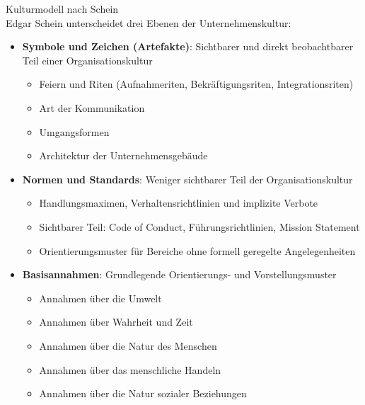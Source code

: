 \begin{concept}{Kulturmodell nach Schein}\\
Edgar Schein unterscheidet drei Ebenen der Unternehmenskultur:
\begin{itemize}
    \item \textbf{Symbole und Zeichen (Artefakte)}: Sichtbarer und direkt beobachtbarer Teil einer Organisationskultur
    \begin{itemize}
        \item Feiern und Riten (Aufnahmeriten, Bekräftigungsriten, Integrationsriten)
        \item Art der Kommunikation
        \item Umgangsformen
        \item Architektur der Unternehmensgebäude
    \end{itemize}
    \item \textbf{Normen und Standards}: Weniger sichtbarer Teil der Organisationskultur
    \begin{itemize}
        \item Handlungsmaximen, Verhaltensrichtlinien und implizite Verbote
        \item Sichtbarer Teil: Code of Conduct, Führungsrichtlinien, Mission Statement
        \item Orientierungsmuster für Bereiche ohne formell geregelte Angelegenheiten
    \end{itemize}
    \item \textbf{Basisannahmen}: Grundlegende Orientierungs- und Vorstellungsmuster
    \begin{itemize}
        \item Annahmen über die Umwelt
        \item Annahmen über Wahrheit und Zeit
        \item Annahmen über die Natur des Menschen
        \item Annahmen über das menschliche Handeln
        \item Annahmen über die Natur sozialer Beziehungen
    \end{itemize}
\end{itemize}
\end{concept}

